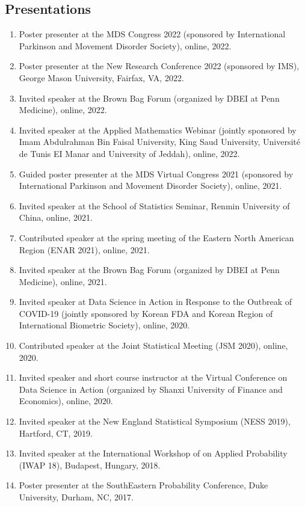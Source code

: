 \documentclass{res}
\begin{document}
\begin{resume}
\section{Presentations}
\begin{enumerate}
	\item Poster presenter at the MDS Congress 2022 (sponsored by 
	International Parkinson and Movement Disorder Society), online, 
	2022. 
	\item Poster presenter at the New Research Conference 2022 
	(sponsored by IMS), George Mason University, Fairfax, VA, 2022.
	\item Invited speaker at the Brown Bag Forum (organized by DBEI 
	at Penn Medicine), online, 2022.
	\item Invited speaker at the Applied Mathematics Webinar 
	(jointly sponsored by Imam Abdulrahman Bin Faisal University, 
	King Saud University, Universit\'{e} de Tunis EI Manar and 
	University of Jeddah), online, 2022.
	\item Guided poster presenter at the MDS Virtual Congress 2021 
	(sponsored by International Parkinson and Movement Disorder 
	Society), online, 2021.
	\item Invited speaker at the School of Statistics Seminar, 
	Renmin University of China, online, 2021.
	\item Contributed speaker at the spring meeting of the Eastern 
	North American Region (ENAR 2021), online, 2021.
	\item Invited speaker at the Brown Bag Forum (organized by DBEI 
	at Penn Medicine), online, 2021.
	\item Invited speaker at Data Science in Action in Response to 
	the Outbreak of COVID-19 (jointly sponsored by Korean FDA and 
	Korean Region of International Biometric Society), online, 2020.
	\item Contributed speaker at the Joint Statistical Meeting (JSM 
	2020), 
	online, 2020.
	\item Invited speaker and short course instructor at the Virtual 
	Conference on Data Science in Action (organized by Shanxi 
	University of Finance and Economics), online, 2020.
	\item Invited speaker at the New England Statistical Symposium (NESS 2019), Hartford, CT, 2019.
	\item Invited speaker at the International Workshop of on Applied Probability (IWAP 18), Budapest, Hungary, 2018.
	\item Poster presenter at the SouthEastern Probability Conference, Duke University, Durham, NC, 2017.

\end{enumerate}
\end{resume}
\end{document}

